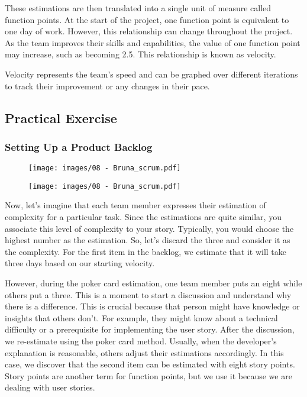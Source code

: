 These estimations are then translated into a single unit of measure
called function points. At the start of the project, one function point
is equivalent to one day of work. However, this relationship can change
throughout the project. As the team improves their skills and
capabilities, the value of one function point may increase, such as
becoming 2.5. This relationship is known as velocity.

Velocity represents the team's speed and can be graphed over different
iterations to track their improvement or any changes in their pace.

\subsection{Practical Exercise}

\subsubsection{Setting Up a Product Backlog}

\begin{figure}[!h]
    \centering
    \texttt{[image: images/08 - Bruna\_scrum.pdf]}
\end{figure}

\begin{figure}[!h]
    \centering
    \texttt{[image: images/08 - Bruna\_scrum.pdf]}
\end{figure}

Now, let's imagine that each team member expresses their estimation of
complexity for a particular task. Since the estimations are quite
similar, you associate this level of complexity to your story.
Typically, you would choose the highest number as the estimation. So,
let's discard the three and consider it as the complexity. For the first
item in the backlog, we estimate that it will take three days based on
our starting velocity.

However, during the poker card estimation, one team member puts an eight
while others put a three. This is a moment to start a discussion and
understand why there is a difference. This is crucial because that
person might have knowledge or insights that others don't. For example,
they might know about a technical difficulty or a prerequisite for
implementing the user story. After the discussion, we re-estimate using
the poker card method. Usually, when the developer's explanation is
reasonable, others adjust their estimations accordingly. In this case,
we discover that the second item can be estimated with eight story
points. Story points are another term for function points, but we use it
because we are dealing with user stories.

